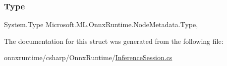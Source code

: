 \subsubsection{\texorpdfstring{Type}{Type}}
{\footnotesize\ttfamily System.\+Type Microsoft.\+M\+L.\+Onnx\+Runtime.\+Node\+Metadata.\+Type\hspace{0.3cm}{\ttfamily [get]}, {\ttfamily [set]}}



The documentation for this struct was generated from the following file\+:\begin{DoxyCompactItemize}
\item 
onnxruntime/csharp/\+Onnx\+Runtime/\mbox{\hyperlink{InferenceSession_8cs}{Inference\+Session.\+cs}}\end{DoxyCompactItemize}
